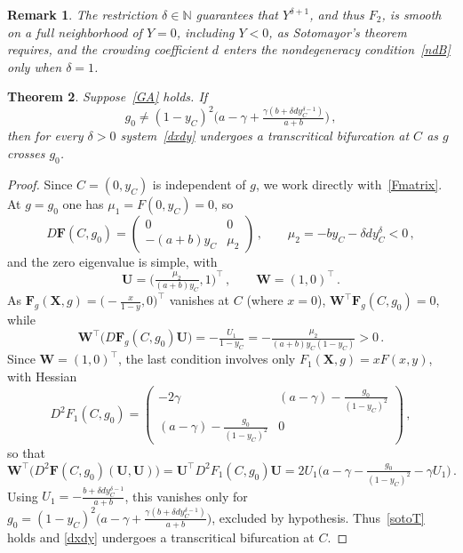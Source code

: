 \documentclass[reqno,11pt]{amsart}
\newtheorem{thm}{Theorem}[section]
\newtheorem{rem}[thm]{Remark}
\numberwithin{equation}{section}
\newcommand{\N}{\mathbb{N}}
\begin{document}
\begin{rem}
The restriction $\delta\in\N$ guarantees that $Y^{\delta+1}$, and thus $F_2$, is smooth on a full neighborhood of $Y=0$, including $Y<0$, as Sotomayor's theorem requires, and the crowding coefficient $d$ enters the nondegeneracy condition~\eqref{ndB} only when $\delta=1$.
\end{rem}

\begin{thm}\label{thm:transcritC}
Suppose~\eqref{GA} holds. If
\begin{equation}\label{ndC}
g_0\neq(1-y_C)^2\Big(a-\gamma+\tfrac{\gamma(b+\delta dy_C^{\delta-1})}{a+b}\Big)\,,
\end{equation}
then for every $\delta>0$ system~\eqref{dxdy} undergoes a transcritical bifurcation at $C$ as $g$ crosses $g_0$.
\end{thm}

\begin{proof}
Since $C=(0,y_C)$ is independent of $g$, we work directly with~\eqref{Fmatrix}. At $g=g_0$ one has $\mu_1=F(0,y_C)=0$, so
\[
D\mathbf F(C,g_0)=\begin{pmatrix}0&0\\-(a+b)y_C&\mu_2\end{pmatrix}\,,\qquad \mu_2=-by_C-\delta dy_C^{\delta}<0\,,
\]
and the zero eigenvalue is simple, with
\[
\mathbf U=\Big(\tfrac{\mu_2}{(a+b)y_C},1\Big)^\top\,,\qquad \mathbf W=(1,0)^\top\,.
\]
As $\mathbf F_g(\mathbf X,g)=\big(-\tfrac{x}{1-y},0\big)^\top$ vanishes at $C$ (where $x=0$), $\mathbf W^\top\mathbf F_g(C,g_0)=0$, while
\[
\mathbf W^\top\big(D\mathbf F_g(C,g_0)\mathbf U\big)=-\tfrac{U_1}{1-y_C}=-\tfrac{\mu_2}{(a+b)y_C(1-y_C)}>0\,.
\]
Since $\mathbf W=(1,0)^\top$, the last condition involves only $F_1(\mathbf X,g)=xF(x,y)$, with Hessian
\[
D^2F_1(C,g_0)=\begin{pmatrix}-2\gamma & (a-\gamma)-\tfrac{g_0}{(1-y_C)^2}\\[2pt] (a-\gamma)-\tfrac{g_0}{(1-y_C)^2} & 0\end{pmatrix}\,,
\]
so that
\[
\mathbf W^\top\big(D^2\mathbf F(C,g_0)(\mathbf U,\mathbf U)\big)=\mathbf U^\top D^2F_1(C,g_0)\mathbf U=2U_1\Big(a-\gamma-\tfrac{g_0}{(1-y_C)^2}-\gamma U_1\Big)\,.
\]
Using $U_1=-\tfrac{b+\delta dy_C^{\delta-1}}{a+b}$, this vanishes only for $g_0=(1-y_C)^2\big(a-\gamma+\tfrac{\gamma(b+\delta dy_C^{\delta-1})}{a+b}\big)$, excluded by hypothesis. Thus~\eqref{sotoT} holds and \eqref{dxdy} undergoes a transcritical bifurcation at $C$.
\end{proof}
\end{document}

